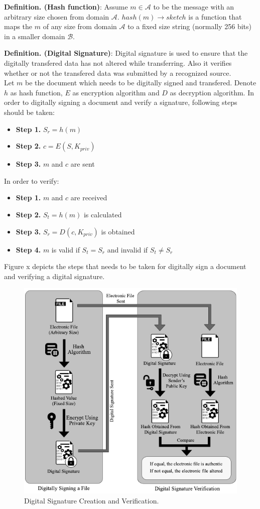 \textbf{Definition. (Hash function)}: Assume $m \in \mathcal{A}$ to be the message with an arbitrary size chosen from domain $\mathcal{A}$. $hash(m)\rightarrow sketch$ 
is a function that maps the $m$ of any size from domain $\mathcal{A}$ to a fixed size string (normally 256 bits) in a smaller domain $\mathcal{B}$.


\textbf{Definition. (Digital Signature)}: Digital signature is used to ensure that the digitally transfered data has not altered while transferring. Also it verifies whether or not the transfered data was submitted by a recognized source. \\
Let $m$ be the document which needs to be digitally signed and transfered. Denote $h$ as hash function, $E$ as encryption algorithm and $D$ as decryption algorithm. In order to digitally signing a document and verify a signature, following steps should be taken:
\begin{itemize}
	\item \textbf{Step 1.} $S_r = h(m)$
	\item \textbf{Step 2.} $c = E(S,K_{priv})$
	\item \textbf{Step 3.} $m$ and $c$ are sent
\end{itemize}
In order to verify:
\begin{itemize}
	\item \textbf{Step 1.} $m$ and $c$ are received
	\item \textbf{Step 2.} $S_t = h(m)$ is calculated
	\item \textbf{Step 3.} $S_r = D(c,K_{priv})$ is obtained
	\item \textbf{Step 4.} $m$ is valid if $S_t = S_r$ and invalid if $S_t \neq S_r$
\end{itemize}
Figure x depicts the steps that needs to be taken for digitally sign a document and verifying a digital signature.
\begin{figure}[H]
	\label{fig:DigitalSignature}
	\centering
	\includegraphics[width=\textwidth]{figs/digital_signature.pdf}
	\caption{Digital Signature Creation and Verification.}
\end{figure}

